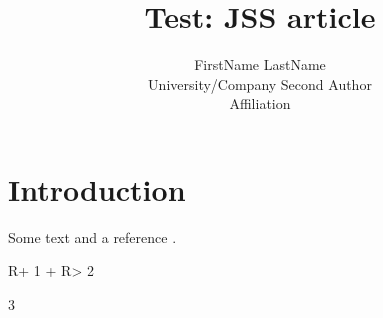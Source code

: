 \documentclass[article,nojss]{jss}
\author{
FirstName LastName\\University/Company \And Second Author\\Affiliation
}
\title{Test: JSS article}
\begin{document}
\hypertarget{introduction}{%
\section{Introduction}\label{introduction}}

Some text and a reference \citep{JSSv059i10}.

\begin{CodeChunk}

\begin{CodeInput}
R+ 1 +
R>   2
\end{CodeInput}

\begin{CodeOutput}
[1] 3
\end{CodeOutput}
\end{CodeChunk}


\end{document}
